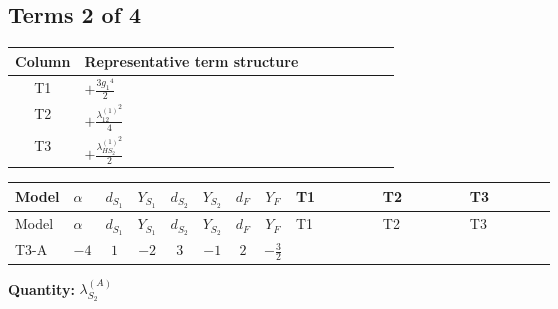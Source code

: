 \documentclass[8pt]{article}
\begin{document}
\begin{landscape}
\subsection*{Terms 2 of 4}
\begin{center}
\begin{tabular}{@{}c >{\raggedright\arraybackslash}p{0.82\linewidth}@{}}
\toprule
Column & Representative term structure \\
\midrule
T1 & \(\displaystyle +\frac{3 {g_1}^4}{2}\) \\
\midrule
T2 & \(\displaystyle +\frac{{\lambda_{12}^{(1)}}^2}{4}\) \\
\midrule
T3 & \(\displaystyle +\frac{{\lambda_{HS_2}^{(1)}}^2}{2}\) \\
\midrule
\bottomrule
\end{tabular}
\end{center}
\smallskip
\tiny
\begin{longtable}{@{}llcccccc >{\raggedright\arraybackslash}p{0.21\linewidth} >{\raggedright\arraybackslash}p{0.21\linewidth} >{\raggedright\arraybackslash}p{0.21\linewidth}@{}}
\toprule
Model & $\alpha$ & $d_{S_1}$ & $Y_{S_1}$ & $d_{S_2}$ & $Y_{S_2}$ & $d_F$ & $Y_F$ & T1 & T2 & T3 \\
\midrule
\endfirsthead
\toprule
Model & $\alpha$ & $d_{S_1}$ & $Y_{S_1}$ & $d_{S_2}$ & $Y_{S_2}$ & $d_F$ & $Y_F$ & T1 & T2 & T3 \\
\midrule
\endhead
T3-A & $-4$ & $1$ & $-2$ & $3$ & $-1$ & $2$ & $-\frac{3}{2}$ & \scriptsize\adjustbox{max width=\linewidth}{$\begin{gathered} +\frac{3 {g_1}^4}{2}\end{gathered}$} & \scriptsize\adjustbox{max width=\linewidth}{$\begin{gathered} +\frac{{\lambda_{12}^{(1)}}^2}{4}\end{gathered}$} & \scriptsize\adjustbox{max width=\linewidth}{$\begin{gathered} +\frac{{\lambda_{HS_2}^{(1)}}^2}{2}\end{gathered}$} \\
\midrule
\bottomrule
\end{longtable}
\clearpage
\noindent\textbf{Quantity: }$\lambda_{S_2}^{(A)}$\par\smallskip

\end{landscape}
\end{document}
